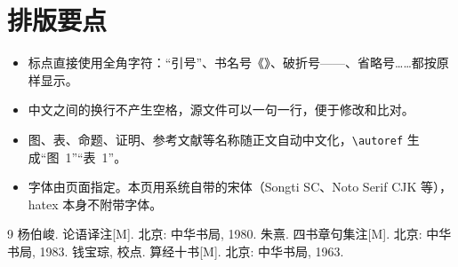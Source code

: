 \section{排版要点}\label{sec:notes}
\begin{itemize}
  \item 标点直接使用全角字符：“引号”、书名号《》、破折号——、省略号……都按原样显示。
  \item 中文之间的换行不产生空格，源文件可以一句一行，便于修改和比对。
  \item 图、表、命题、证明、参考文献等名称随正文自动中文化，\verb|\autoref| 生成“图~1”“表~1”。
  \item 字体由页面指定。本页用系统自带的宋体（Songti SC、Noto Serif CJK 等），hatex 本身不附带字体。
\end{itemize}

\begin{thebibliography}{9}
   杨伯峻. 论语译注[M]. 北京: 中华书局, 1980.
   朱熹. 四书章句集注[M]. 北京: 中华书局, 1983.
   钱宝琮, 校点. 算经十书[M]. 北京: 中华书局, 1963.
\end{thebibliography}
